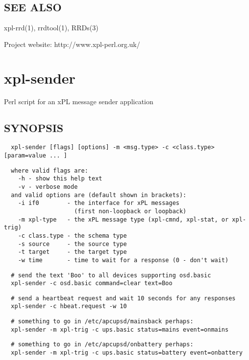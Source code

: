 \subsection*{SEE ALSO\label{xpl-rrd-graphs_SEE_ALSO}}


xpl-rrd(1), rrdtool(1), RRDs(3)



Project website: http://www.xpl-perl.org.uk/

\section{xpl-sender\label{xpl-sender}}


Perl script for an xPL message sender application

\subsection*{SYNOPSIS\label{xpl-sender_SYNOPSIS}}
\begin{verbatim}
  xpl-sender [flags] [options] -m <msg.type> -c <class.type> [param=value ... ]
\end{verbatim}
\begin{verbatim}
  where valid flags are:
    -h - show this help text
    -v - verbose mode
  and valid options are (default shown in brackets):
    -i if0        - the interface for xPL messages
                    (first non-loopback or loopback)
    -m xpl-type   - the xPL message type (xpl-cmnd, xpl-stat, or xpl-trig)
    -c class.type - the schema type
    -s source     - the source type
    -t target     - the target type
    -w time       - time to wait for a response (0 - don't wait)
\end{verbatim}
\begin{verbatim}
  # send the text 'Boo' to all devices supporting osd.basic
  xpl-sender -c osd.basic command=clear text=Boo
\end{verbatim}
\begin{verbatim}
  # send a heartbeat request and wait 10 seconds for any responses
  xpl-sender -c hbeat.request -w 10
\end{verbatim}
\begin{verbatim}
  # something to go in /etc/apcupsd/mainsback perhaps:
  xpl-sender -m xpl-trig -c ups.basic status=mains event=onmains
\end{verbatim}
\begin{verbatim}
  # something to go in /etc/apcupsd/onbattery perhaps:
  xpl-sender -m xpl-trig -c ups.basic status=battery event=onbattery
\end{verbatim}
